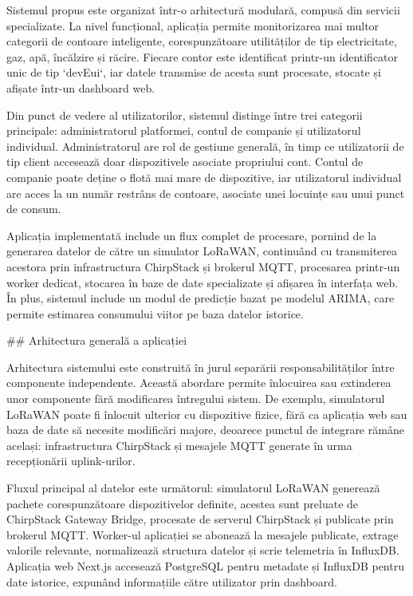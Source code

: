 Sistemul propus este organizat într-o arhitectură modulară, compusă din
servicii specializate. La nivel funcțional, aplicația permite
monitorizarea mai multor categorii de contoare inteligente,
corespunzătoare utilităților de tip electricitate, gaz, apă, încălzire
și răcire. Fiecare contor este identificat printr-un identificator unic
de tip `devEui`, iar datele transmise de acesta sunt procesate, stocate
și afișate într-un dashboard web.

Din punct de vedere al utilizatorilor, sistemul distinge între trei
categorii principale: administratorul platformei, contul de companie și
utilizatorul individual. Administratorul are rol de gestiune generală,
în timp ce utilizatorii de tip client accesează doar dispozitivele
asociate propriului cont. Contul de companie poate deține o flotă mai
mare de dispozitive, iar utilizatorul individual are acces la un număr
restrâns de contoare, asociate unei locuințe sau unui punct de consum.

Aplicația implementată include un flux complet de procesare, pornind de
la generarea datelor de către un simulator LoRaWAN, continuând cu
transmiterea acestora prin infrastructura ChirpStack și brokerul MQTT,
procesarea printr-un worker dedicat, stocarea în baze de date
specializate și afișarea în interfața web. În plus, sistemul include un
modul de predicție bazat pe modelul ARIMA, care permite estimarea
consumului viitor pe baza datelor istorice.

## Arhitectura generală a aplicației

Arhitectura sistemului este construită în jurul separării
responsabilităților între componente independente. Această abordare
permite înlocuirea sau extinderea unor componente fără modificarea
întregului sistem. De exemplu, simulatorul LoRaWAN poate fi înlocuit
ulterior cu dispozitive fizice, fără ca aplicația web sau baza de date
să necesite modificări majore, deoarece punctul de integrare rămâne
același: infrastructura ChirpStack și mesajele MQTT generate în urma
recepționării uplink-urilor.

Fluxul principal al datelor este următorul: simulatorul LoRaWAN
generează pachete corespunzătoare dispozitivelor definite, acestea sunt
preluate de ChirpStack Gateway Bridge, procesate de serverul ChirpStack
și publicate prin brokerul MQTT. Worker-ul aplicației se abonează la
mesajele publicate, extrage valorile relevante, normalizează structura
datelor și scrie telemetria în InfluxDB. Aplicația web Next.js accesează
PostgreSQL pentru metadate și InfluxDB pentru date istorice, expunând
informațiile către utilizator prin dashboard.

